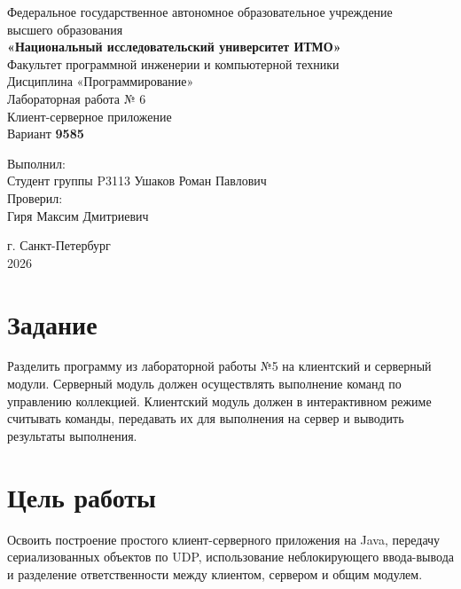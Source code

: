 \documentclass[a4paper,14pt]{extarticle}
\begin{document}
\begin{titlepage}
\begin{center}
Федеральное государственное автономное образовательное учреждение\\
высшего образования\\
\textbf{«Национальный исследовательский университет ИТМО»}\\[10mm]

Факультет программной инженерии и компьютерной техники\\
Дисциплина «Программирование»\\[34mm]

{\large Лабораторная работа № 6}\\[4mm]
Клиент-серверное приложение\\
Вариант \textbf{9585}
\end{center}

\vfill
\begin{flushright}
Выполнил:\\
Студент группы P3113
Ушаков Роман Павлович\\[5mm]
Проверил:\\
Гиря Максим Дмитриевич

\end{flushright}

\vfill
\begin{center}
г. Санкт-Петербург\\ 2026
\end{center}
\end{titlepage}

\setcounter{page}{2}
\tableofcontents
\newpage

\section{Задание}

Разделить программу из лабораторной работы №5 на клиентский и серверный модули. Серверный модуль должен осуществлять выполнение команд по управлению коллекцией. Клиентский модуль должен в интерактивном режиме считывать команды, передавать их для выполнения на сервер и выводить результаты выполнения.


\section{Цель работы}

Освоить построение простого клиент-серверного приложения на Java, передачу сериализованных объектов по UDP, использование неблокирующего ввода-вывода и разделение ответственности между клиентом, сервером и общим модулем.
\end{document}
